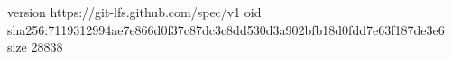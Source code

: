 version https://git-lfs.github.com/spec/v1
oid sha256:7119312994ae7e866d0f37c87dc3c8dd530d3a902bfb18d0fdd7e63f187de3e6
size 28838
